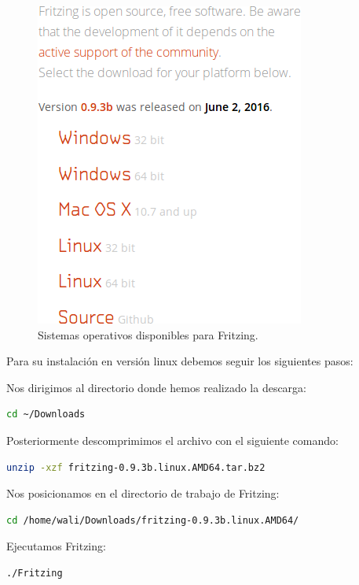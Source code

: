\begin{appendix}
\begin{figure}[H]
  \begin{center}
    \includegraphics[scale=0.5]{imagenes/fritzing_download.png}
  \end{center}
  \label{fig:descarga_arduino}
 \caption{Sistemas operativos disponibles para Fritzing.}
 \end{figure}

Para su instalación en versión linux debemos seguir los siguientes pasos:

Nos dirigimos al directorio donde hemos realizado la descarga:

\begin{lstlisting}[language=bash]
cd ~/Downloads
\end{lstlisting}

Posteriormente descomprimimos el archivo con el siguiente comando:

\begin{lstlisting}[language=bash]
unzip -xzf fritzing-0.9.3b.linux.AMD64.tar.bz2
\end{lstlisting}


Nos posicionamos en el directorio de trabajo de Fritzing:

\begin{lstlisting}[language=bash]
cd /home/wali/Downloads/fritzing-0.9.3b.linux.AMD64/
\end{lstlisting}


Ejecutamos Fritzing:


\begin{lstlisting}[language=bash]
./Fritzing
\end{lstlisting}


\end{appendix}

